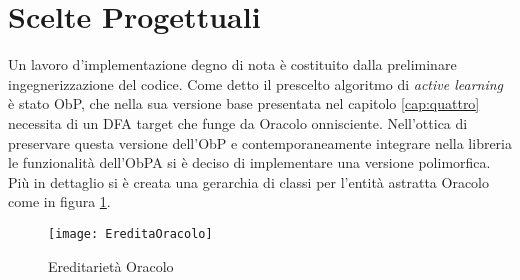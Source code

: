 \section{Scelte Progettuali}
Un lavoro d'implementazione degno di nota è costituito dalla preliminare ingegnerizzazione del codice. Come detto il prescelto algoritmo di \textit{active learning} è stato \ac{ObP}, che nella sua versione base presentata nel capitolo \ref{cap:quattro} necessita di un \ac{DFA} target che funge da Oracolo onnisciente. Nell'ottica di preservare questa versione dell'\ac{ObP} e contemporaneamente integrare nella libreria le funzionalità dell'\ac{ObPA} si è deciso di implementare una versione polimorfica. Più in dettaglio si è creata una gerarchia di classi per l'entità astratta Oracolo come in figura \ref{fig:eor}.
\begin{figure}[htp]
	\centering
	\texttt{[image: EreditaOracolo]}
	\caption[Ereditarietà Oracolo]{Ereditarietà Oracolo}
   \label{fig:eor}
\end{figure}

